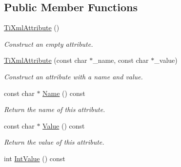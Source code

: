\subsection*{Public Member Functions}
\begin{DoxyCompactItemize}
\item 
\hyperlink{classTiXmlAttribute_a9cfa3c8179873fd485d83003b114f8e1}{Ti\+Xml\+Attribute} ()\hypertarget{classTiXmlAttribute_a9cfa3c8179873fd485d83003b114f8e1}{}\label{classTiXmlAttribute_a9cfa3c8179873fd485d83003b114f8e1}

\begin{DoxyCompactList}\small\item\em Construct an empty attribute. \end{DoxyCompactList}\item 
\hyperlink{classTiXmlAttribute_a759d0b76fb8fcf765ecab243bc14f05e}{Ti\+Xml\+Attribute} (const char $\ast$\+\_\+name, const char $\ast$\+\_\+value)\hypertarget{classTiXmlAttribute_a759d0b76fb8fcf765ecab243bc14f05e}{}\label{classTiXmlAttribute_a759d0b76fb8fcf765ecab243bc14f05e}

\begin{DoxyCompactList}\small\item\em Construct an attribute with a name and value. \end{DoxyCompactList}\item 
const char $\ast$ \hyperlink{classTiXmlAttribute_a298a57287d305904ba6bd96ae6f78d3d}{Name} () const \hypertarget{classTiXmlAttribute_a298a57287d305904ba6bd96ae6f78d3d}{}\label{classTiXmlAttribute_a298a57287d305904ba6bd96ae6f78d3d}

\begin{DoxyCompactList}\small\item\em Return the name of this attribute. \end{DoxyCompactList}\item 
const char $\ast$ \hyperlink{classTiXmlAttribute_a0f874490eac8ca00ee0070765d0e97e3}{Value} () const \hypertarget{classTiXmlAttribute_a0f874490eac8ca00ee0070765d0e97e3}{}\label{classTiXmlAttribute_a0f874490eac8ca00ee0070765d0e97e3}

\begin{DoxyCompactList}\small\item\em Return the value of this attribute. \end{DoxyCompactList}\item 
int \hyperlink{classTiXmlAttribute_aa1a20ad59dc7e89a0ab265396360d50f}{Int\+Value} () const \hypertarget{classTiXmlAttribute_aa1a20ad59dc7e89a0ab265396360d50f}{}\label{classTiXmlAttribute_aa1a20ad59dc7e89a0ab265396360d50f}


\end{DoxyCompactItemize}
